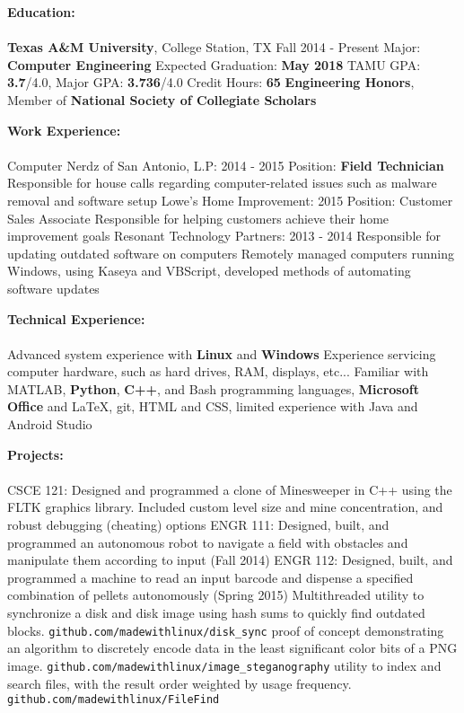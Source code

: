 \documentclass[12pt]{article}
\newcommand{\upspace}{\vspace{0px}}
\newcommand{\zzz}[1]{\upspace \0 \textbf{#1} \\ \vspace{-0.7\baselineskip} \hrulefill \vspace{-2px} \\ }
\newcommand{\aaa}{\upspace \1}
\newcommand{\bbb}{\upspace \2}
\begin{document}
\begin{flushleft}
\begin{outline}[compactitem]

\zzz{Education:}
	\aaa \textbf{Texas A\&M University}, College Station, TX \hfill Fall 2014 - Present
		\bbb Major: \textbf{Computer Engineering}
		\bbb Expected Graduation: \textbf{May 2018}
		\bbb TAMU GPA: \textbf{3.7}/4.0, Major GPA: \textbf{3.736}/4.0
		\bbb Credit Hours: \textbf{65}
		\bbb \textbf{Engineering Honors}, Member of \textbf{National Society of Collegiate Scholars}

\zzz{Work Experience:}

	\aaa Computer Nerdz of San Antonio, L.P: \hfill 2014 - 2015
		\bbb Position: \textbf{Field Technician}
		\bbb Responsible for house calls regarding computer-related issues such as malware removal and software setup
	\aaa Lowe's Home Improvement: \hfill 2015
		\bbb Position: Customer Sales Associate
		\bbb Responsible for helping customers achieve their home improvement goals
	\aaa Resonant Technology Partners: \hfill 2013 - 2014
		\bbb Responsible for updating outdated software on computers
		\bbb Remotely managed computers running Windows, using Kaseya and VBScript, developed methods of automating software updates

\zzz{Technical Experience:}
	\aaa Advanced system experience with \textbf{Linux} and \textbf{Windows}
	\aaa Experience servicing computer hardware, such as hard drives, RAM, displays, etc...
	\aaa Familiar with MATLAB, \textbf{Python}, \textbf{C++}, and Bash programming languages, 
	\textbf{Microsoft Office} and LaTeX, git, HTML and CSS, limited experience with Java and Android Studio

\zzz{Projects:}
	\aaa CSCE 121: Designed and programmed a clone of Minesweeper in C++ using the FLTK graphics library. Included custom level size and mine concentration, and robust debugging (cheating) options
	\aaa ENGR 111: Designed, built, and programmed an autonomous robot to navigate 
	a field with obstacles and manipulate them according to input (Fall 2014)
	\aaa ENGR 112: Designed, built, and programmed a machine to read an input 
	barcode and dispense a specified combination of pellets autonomously (Spring 2015)
	\aaa Multithreaded utility to synchronize a disk and disk image using hash sums to quickly find outdated blocks.
		\verb|github.com/madewithlinux/disk_sync|
	\aaa proof of concept demonstrating an algorithm to discretely encode data in the least significant color bits of a PNG image.
		\verb|github.com/madewithlinux/image_steganography|
	\aaa utility to index and search files, with the result order weighted by usage frequency.
		\verb|github.com/madewithlinux/FileFind|


\end{outline}
\end{flushleft}
\end{document}

